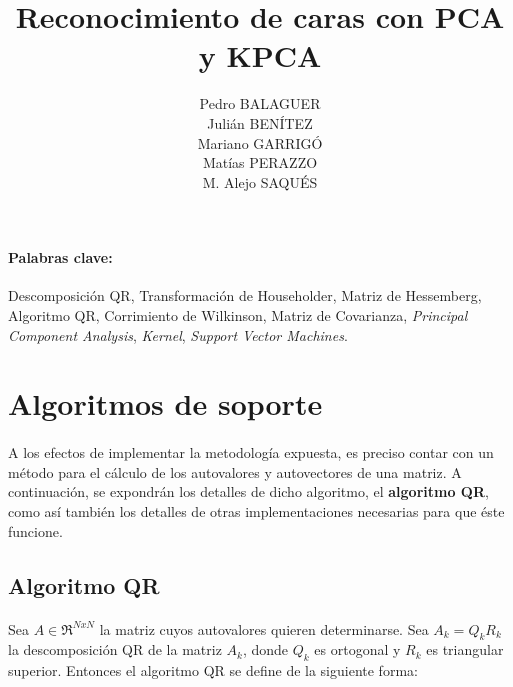 \documentclass[12pt, twocolumn]{article}
\begin{document}
	\title{Reconocimiento de caras con PCA y KPCA}
	\author{Pedro BALAGUER \\ Julián BENÍTEZ \\ Mariano GARRIGÓ \\ Matías PERAZZO \\ M. Alejo SAQUÉS}
	\date{}
	\maketitle
	
	\begin{abstract}
		
		
	\end{abstract}
	
	\paragraph{Palabras clave:} Descomposición QR, Transformación de Householder, Matriz de Hessemberg, Algoritmo QR, Corrimiento de Wilkinson, Matriz de Covarianza, \textit{Principal Component Analysis}, \textit{Kernel}, \textit{Support Vector Machines}.
	
	\section{Algoritmos de soporte}
	
	\paragraph{} A los efectos de implementar la metodología expuesta, es preciso contar con un método para el cálculo de los autovalores y autovectores de una matriz. A continuación, se expondrán los detalles de dicho algoritmo, el \textbf{algoritmo QR}, como así también los detalles de otras implementaciones necesarias para que éste funcione.
	
	\subsection{Algoritmo QR}
	
	\paragraph{} Sea $A \in \Re^{NxN}$ la matriz cuyos autovalores quieren determinarse. Sea $A_{k}=Q_{k}R_{k}$ la descomposición QR de la matriz $A_{k}$, donde $Q_{k}$ es ortogonal y $R_{k}$ es triangular superior. Entonces el algoritmo QR se define de la siguiente forma:
	
\end{document}
